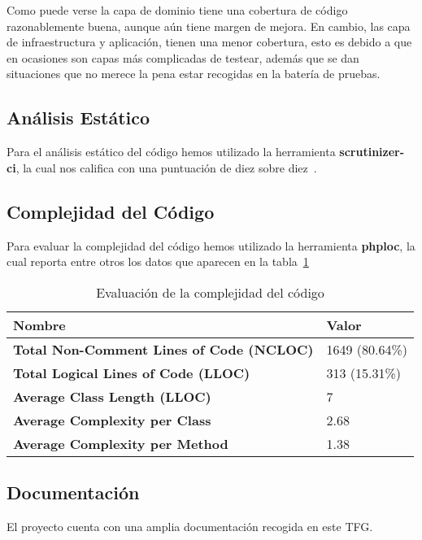 Como puede verse la capa de dominio tiene una cobertura de código razonablemente buena, aunque aún tiene margen de
mejora.
En cambio, las capa de infraestructura y aplicación, tienen una menor cobertura, esto es debido a que en ocasiones son
capas más complicadas de testear, además que se dan situaciones que no merece la pena estar recogidas en la batería de
pruebas.

\subsection*{Análisis Estático}

Para el análisis estático del código hemos utilizado la herramienta \textbf{scrutinizer-ci}, la cual nos califica
con una puntuación de diez sobre diez~\cite{https://scrutinizer-ci.com/g/desarrolla2/viu_84_proyecto/}.

\subsection*{Complejidad del Código}

Para evaluar la complejidad del código hemos utilizado la herramienta \textbf{phploc}, la cual reporta entre otros los
datos que aparecen en la tabla~\ref{tab:phploc_report}

\begin{table}[h]
    \renewcommand{\arraystretch}{1.5}
    \setlength{\tabcolsep}{10pt}
    \centering
    \begin{tabular}{>{\bfseries}p{} p{}  }
        \toprule
        \textbf{Nombre}                         & \textbf{Valor} \\
        \midrule
        Total Non-Comment Lines of Code (NCLOC) & 1649 (80.64\%) \\
        Total Logical Lines of Code (LLOC)      & 313 (15.31\%)  \\
        Average Class Length (LLOC)             & 7              \\
        Average Complexity per Class            & 2.68           \\
        Average Complexity per Method           & 1.38           \\
        \bottomrule
    \end{tabular}
    \caption{Evaluación de la complejidad del código}
    \label{tab:phploc_report}
\end{table}

\subsection*{Documentación}

El proyecto cuenta con una amplia documentación recogida en este TFG.